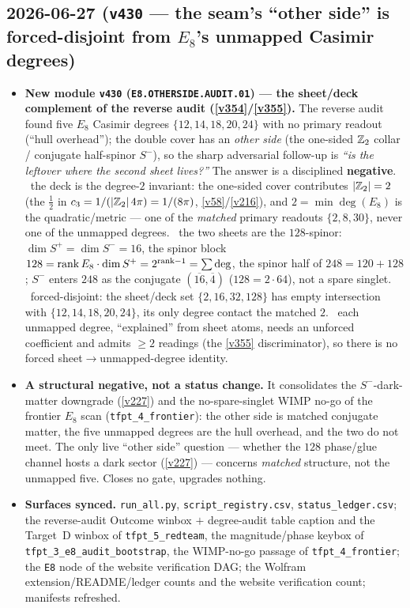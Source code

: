 \subsection*{2026-06-27 (\texttt{v430} --- the seam's ``other side'' is forced-disjoint from $E_8$'s unmapped Casimir degrees)}
\begin{itemize}
\item \textbf{New module \texttt{v430} (\texttt{E8.OTHERSIDE.AUDIT.01}) --- the sheet/deck complement of the
reverse audit (\vref{v354}/\vref{v355}).} The reverse audit found five $E_8$ Casimir degrees
$\{12,14,18,20,24\}$ with no primary readout (``hull overhead''); the double cover has an \emph{other side}
(the one-sided $\mathbb{Z}_2$ collar / conjugate half-spinor $S^-$), so the sharp adversarial follow-up is
\emph{``is the leftover where the second sheet lives?''} The answer is a disciplined \textbf{negative}.
\mE\ the deck is the degree-$2$ invariant: the one-sided cover contributes $|\mathbb{Z}_2|=2$ (the $\tfrac12$ in
$c_3=1/(|\mathbb{Z}_2|\,4\pi)=1/(8\pi)$, \vref{v58}/\vref{v216}), and $2=\min\deg(E_8)$ is the quadratic/metric ---
one of the \emph{matched} primary readouts $\{2,8,30\}$, never one of the unmapped degrees.
\mE\ the two sheets are the $128$-spinor: $\dim S^+{=}\dim S^-{=}16$, the spinor block
$128={\rm rank}\,E_8\cdot\dim S^+=2^{{\rm rank}-1}=\sum\deg$, the spinor half of $248=120+128$; $S^-$ enters
$248$ as the conjugate $(\overline{16},\overline4)$ ($128=2\cdot64$), not a spare singlet.
\mE\ forced-disjoint: the sheet/deck set $\{2,16,32,128\}$ has empty intersection with $\{12,14,18,20,24\}$,
its only degree contact the matched $2$. \mO\ each unmapped degree, ``explained'' from sheet atoms, needs an
unforced coefficient and admits $\ge2$ readings (the \vref{v355} discriminator), so there is no forced
sheet$\to$unmapped-degree identity.
\item \textbf{A structural negative, not a status change.} It consolidates the $S^-$-dark-matter downgrade
(\vref{v227}) and the no-spare-singlet WIMP no-go of the frontier $E_8$ scan (\texttt{tfpt\_4\_frontier}): the
other side is matched conjugate matter, the five unmapped degrees are the hull overhead, and the two do not
meet. The only live ``other side'' question --- whether the $128$ phase/glue channel hosts a dark sector
(\vref{v227}) --- concerns \emph{matched} structure, not the unmapped five. Closes no gate, upgrades nothing.
\item \textbf{Surfaces synced.} \texttt{run\_all.py}, \texttt{script\_registry.csv},
\texttt{status\_ledger.csv}; the reverse-audit Outcome winbox $+$ degree-audit table caption and the Target~D
winbox of \texttt{tfpt\_5\_redteam}, the magnitude/phase keybox of \texttt{tfpt\_3\_e8\_audit\_bootstrap}, the
WIMP-no-go passage of \texttt{tfpt\_4\_frontier}; the \texttt{E8} node of the website verification DAG; the
Wolfram extension/README/ledger counts and the website verification count; manifests refreshed.
\end{itemize}

